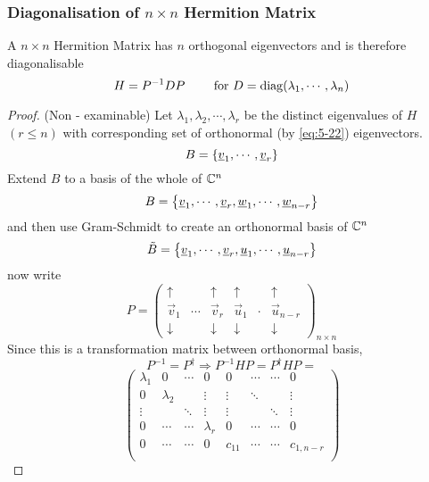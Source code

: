 \documentclass{article}
\numberwithin{equation}{section}
\begin{document}
\subsubsection{Diagonalisation of $n \times n$ Hermition Matrix}
\begin{thm}
    A $n \times n$ Hermition Matrix has $n$ orthogonal eigenvectors and is therefore diagonalisable
    \begin{equation}\label{eq:5-23}
        H = P^{-1}DP \qquad \text{ for } D = \operatorname{diag}(\lambda_1, \cdots, \lambda_n)
    \end{equation}
\end{thm}
\begin{proof} (Non - examinable)
    Let $\lambda_1, \lambda_2, \cdots, \lambda_r$ be the distinct eigenvalues of $H$ $(r \leq n)$ with corresponding set of orthonormal (by \eqref{eq:5-22}) eigenvectors.
    \[
        B = \left\{ \underline{v}_1, \cdots, \underline{v}_r \right\} 
    \]
    Extend $B$ to a basis of the whole of $\mathbb{C}^n$
    \[
        B = \left\{ \underline{v}_1, \cdots, \underline{v}_r, \underline{w}_1, \cdots, \underline{w}_{n-r} \right\}  
    \]
    and then use Gram-Schmidt to create an orthonormal basis of $\mathbb{C}^n$
    \[
        \tilde{B} = \left\{ \underline{v}_1, \cdots, \underline{v}_r, \underline{u}_1, \cdots, \underline{u}_{n-r} \right\}
    \]
    now write 
    \[
        P = \begin{pmatrix}
            \uparrow & & \uparrow & \uparrow & & \uparrow \\
            \vec v_1 & \cdots & \vec v_r & \vec u_1 & \cdot & \vec u_{n-r} \\
            \downarrow & & \downarrow & \downarrow & & \downarrow
        \end{pmatrix}_{n \times n} 
    \]
    Since this is a transformation matrix between orthonormal basis,
    \[
        P^{-1} = P^\dagger \Rightarrow P^{-1}HP = P^\dagger H P =
    \]
    \[
        \begin{pmatrix}
            \lambda_1 & 0         & \cdots & 0         & 0          & \cdots & \cdots & 0 \\
            0         & \lambda_2 &        & \vdots    & \vdots     & \ddots &        & \vdots \\
            \vdots    &           & \ddots & \vdots    & \vdots     &        & \ddots & \vdots \\
            0         & \cdots    & \cdots & \lambda_r & 0          & \cdots & \cdots & 0 \\
            0         & \cdots    & \cdots & 0         & c_{11}     & \cdots & \cdots & c_{1, n-r} \\  

\end{pmatrix}\]
\end{proof}
\end{document}
